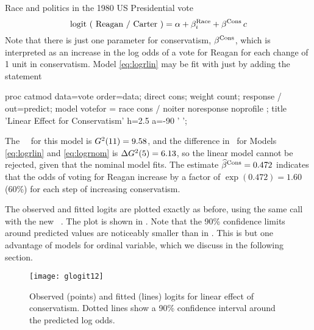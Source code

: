 \begin{Example}[reagan]{Race and politics in the 1980 US Presidential vote}
\begin{equation} \label{eq:logrlin}
  \mbox{logit ( Reagan / Carter )}  =
  \alpha   +
  \beta _i^{\mbox{\scriptsize Race}}  +
  \beta ^{\mbox{\scriptsize Cons}} \,  c
\end{equation}
Note that there is just one parameter for conservatism,
$ \beta ^{\mbox{\scriptsize Cons}}$, which is interpreted as
an increase in the log odds of a vote for Reagan for each
change of 1 unit in conservatism.
Model \eqref{eq:logrlin} may be fit with 
just by adding the statement 
\begin{listing}
proc catmod data=vote order=data;
   direct cons;
   weight count;
   response / out=predict;
   model votefor = race cons / noiter noresponse noprofile ;
   title 'Linear Effect for Conservatism' h=2.5 a=-90 ' ';
\end{listing}
The \LR\ \GSQ\ for this model is $G^2 (11) = 9.58$, and
the difference in \GSQ\ for Models
\eqref{eq:logrlin} and \eqref{eq:logrnom} is
$\Delta G^2 (5) = 6.13$,
so the linear model cannot be rejected, given that the nominal
model fits.  The estimate $\widehat{\beta} ^{\mbox{\scriptsize Cons}} = 0.472$
indicates that the odds of voting for Reagan increase by a factor of
$\exp(0.472) = 1.60$ (60\%) for each step of increasing conservatism.

%

The observed and fitted logits are plotted exactly as before, using
the same  call with the new \ODS\ .
The plot is shown in .
Note that the 90\% confidence limits around predicted values are
noticeably smaller than in .
This is but one advantage of models for ordinal variable,
which we discuss in the following section.
\begin{figure}[htb]
  \centering
  \texttt{[image: glogit12]}
  \caption[Observed and fitted logits for linear effect of conservatism]{Observed (points) and fitted (lines) logits for linear effect of conservatism.  Dotted lines show a 90\% confidence interval around the predicted log odds.}%
  \label{fig:glogit12}
\end{figure}
\end{Example}
